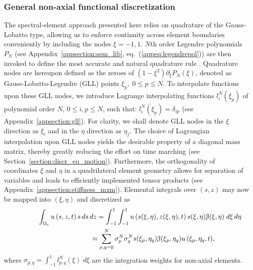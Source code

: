\documentclass[11pt,letter,fleqn,english,notitlepage]{article}
\newcommand{\eqa}{\begin{eqnarray}} \newcommand{\ena}{\end{eqnarray}}
\begin{document}
\subsubsection{General non-axial functional discretization}\label{section:nonax}
%
The spectral-element approach presented here relies on quadrature of the 
Gauss-Lobatto type, allowing us to enforce continuity across element 
boundaries conveniently by including the nodes $\xi=-1,1$. 
$N$th order Legendre polynomials $P_N$ 
(see Appendix~\ref{appsection:sem_lib}, eq.~(\ref{appeq:legendrepol})) 
are then invoked to define the most accurate and natural quadrature rule 
\citep{dfm}. Quadrature nodes are hereupon defined as the zeroes of 
$(1-\xi^2)\partial_\xi P_N(\xi)$, 
denoted as Gauss-Lobatto-Legendre (GLL) points $\xi_p,\;0\le p \le N$.
To interpolate functions upon these GLL nodes, we introduce Lagrange 
interpolating functions $l^N_i(\xi_p)$ of polynomial order $N$, 
$0\le i,p\le N$, such that: $l^N_i(\xi_p)=\delta_{ip}$ (see 
Appendix~\ref{appsection:gll}). For clarity, we shall denote GLL nodes 
in the $\xi$ direction as $\xi_i$ and in the $\eta$ direction as $\eta_j$.
The choice of Lagrangian interpolation upon GLL nodes yields the desirable 
property of a diagonal mass matrix, thereby greatly reducing the effort on 
time marching (see Section~\ref{section:discr_eq_motion}).
Furthermore, the orthogonality of coordinates $\xi$ and $\eta$ in a 
quadrilateral element geometry allows for separation of variables and 
leads to efficiently implemented tensor products (see 
Appendix~\ref{appsection:stiffness_mxm}).
Elemental integrals over $(s,z)$ may now be mapped into $(\xi,\eta)$ and 
discretized as
%
\eqa \label{eq:gll_quad_nonax}
\lefteqn{\int_{\Omega_e}u\left(s,z,t\right)s\,ds\,dz
=\int_{-1}^{1}\int_{-1}^{1}u\left(s(\xi,\eta),z(\xi,\eta),t\right)s(\xi,\eta)
{\mathcal J}(\xi,\eta)\;d\xi \,d\eta }\nonumber \\
&&\mbox{}\hspace{2.3cm} %
\approx \sum\limits_{p,q=0}^{N}
\sigma^N_p \sigma^N_{q}s(\xi_p,\eta_q){\mathcal J}(\xi_p,\eta_q) 
{u\left(\xi_p,\eta_q,t\right)},
\ena
where $\sigma_{p,q}=\int_{-1}^{1}l^N_{p,q}(\xi)\;d\xi$ 
are the integration weights for non-axial elements. 
\end{document}
